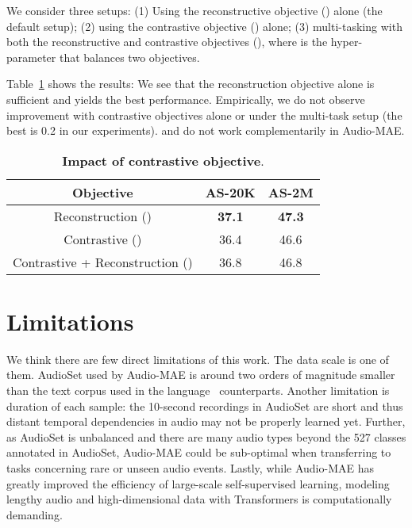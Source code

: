 \documentclass{article}
\newcommand{\tablestyle}[2]{\setlength{\tabcolsep}{#1}\renewcommand{\arraystretch}{#2}\centering\footnotesize}
\begin{document}
We consider three setups: (1) Using the reconstructive objective () alone (the default setup); (2) using the contrastive objective () alone; (3) multi-tasking with both the reconstructive and contrastive objectives (), where  is the hyper-parameter that balances two objectives.

Table~\ref{tab:supp:contrastive} shows the results: We see that the reconstruction objective  alone is sufficient and yields the best performance. 
Empirically, we do not observe improvement with contrastive objectives alone or under the multi-task setup (the best  is 0.2 in our experiments).  and  do not work complementarily in Audio-MAE.

\begin{table}[h!]
\small
\tablestyle{2pt}{1.05}
\setlength\tabcolsep{1.0pt}
\begin{tabular}{ccc}
    Objective & AS-20K & AS-2M  \\
    \toprule
    Reconstruction ()&  \textbf{37.1} & \textbf{47.3}  \\
    Contrastive ()& 36.4 & 46.6  \\
    Contrastive + Reconstruction ()& 36.8 & 46.8 \\
\end{tabular}
\vspace{3pt}
\caption{\textbf{Impact of contrastive objective}.\label{tab:supp:contrastive}}
\end{table}



\section{Limitations}
\label{sec:app:limitations}

We think there are few direct limitations of this work.
The data scale is one of them. 
AudioSet used by Audio-MAE is around two orders of magnitude smaller than the text corpus used in the language~\cite{bert,roberta,gpt}
counterparts.
Another limitation is duration of each sample: the 10-second recordings in AudioSet are short and thus distant temporal dependencies in audio may not be properly learned yet.
Further, as AudioSet is unbalanced and there are many audio types beyond the 527 classes annotated in AudioSet, Audio-MAE could be sub-optimal when transferring to tasks concerning rare or unseen audio events.
Lastly, while Audio-MAE has greatly improved the efficiency of large-scale self-supervised learning, modeling lengthy audio and high-dimensional data with Transformers is computationally demanding. 
\end{document}
